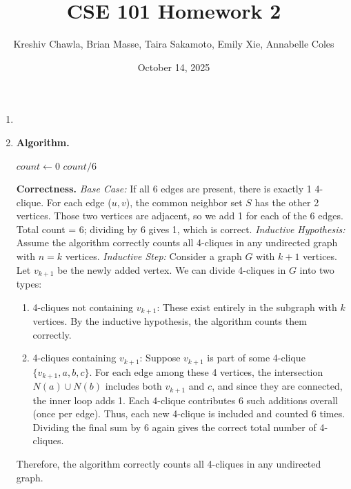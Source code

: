 \documentclass[12pt, letterpaper]{article}
\title{CSE 101 Homework 2}
\author{Kreshiv Chawla, Brian Masse, Taira Sakamoto, Emily Xie, Annabelle Coles}
\date{October 14, 2025}
\begin{document}
\maketitle
\newpage

\begin{enumerate}

\item

\newpage
\item 
    \textbf{Algorithm.} \newline
    \begin{algorithm}[H]
    $count \gets 0$\;
    \Return $count / 6$\;
    \end{algorithm}
    
    \textbf{Correctness.} \medskip \newline
    \textit{Base Case:} If all 6 edges are present, there is exactly 1 4-clique. For each edge ($u,v$), the common neighbor set $S$ has the other 2 vertices. Those two vertices are adjacent, so we add 1 for each of the 6 edges. Total count = 6; dividing by 6 gives 1, which is correct. \medskip \newline
    \textit{Inductive Hypothesis:} Assume the algorithm correctly counts all 4-cliques in any undirected graph with $n=k$ vertices. \medskip \newline
    \textit{Inductive Step:} Consider a graph $G$ with $k+1$ vertices. Let $v_{k+1}$ be the newly added vertex. We can divide 4-cliques in $G$ into two types:
    \begin{enumerate}
        \item 4-cliques not containing $v_{k+1}$: These exist entirely in the subgraph with $k$ vertices. By the inductive hypothesis, the algorithm counts them correctly.
        \item 4-cliques containing $v_{k+1}$: Suppose $v_{k+1}$ is part of some 4-clique $\{v_{k+1},a,b,c\}$. For each edge among these 4 vertices, the intersection $N(a)\cup N(b)$ includes both $v_{k+1}$ and $c$, and since they are connected, the inner loop adds 1. Each 4-clique contributes 6 such additions overall (once per edge). Thus, each new 4-clique is included and counted 6 times. Dividing the final sum by 6 again gives the correct total number of 4-cliques.
    \end{enumerate}
    Therefore, the algorithm correctly counts all 4-cliques in any undirected graph.\medskip
    

\end{enumerate}
\end{document}
